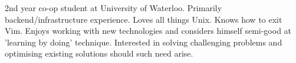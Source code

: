 

\begin{cvparagraph}

2nd year co-op student at University of Waterloo. Primarily backend/infrastructure experience. Loves all things Unix. Knows how to exit Vim. Enjoys working with new technologies and considers himself semi-good at 'learning by doing' technique. Interested in solving challenging problems and optimising existing solutions should such need arise.
\end{cvparagraph}
